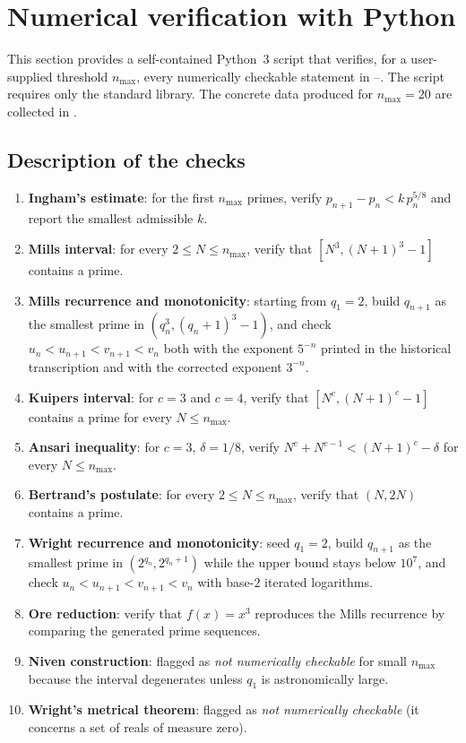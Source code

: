 \documentclass[11pt,reqno]{amsart}
\theoremstyle{redplain}
\numberwithin{equation}{section}
\begin{document}
\section{Numerical verification with Python}
\label{sec:python}

This section provides a self-contained Python~3 script that verifies, for
a user-supplied threshold $n_{\max}$, every numerically checkable
statement in --. The
script requires only the standard library. The concrete data produced for
$n_{\max}=20$ are collected in .

\subsection{Description of the checks}

\begin{enumerate}
\item \textbf{Ingham's estimate}: for the first $n_{\max}$ primes, verify
$p_{n+1}-p_n<k\,p_n^{5/8}$ and report the smallest admissible $k$.
\item \textbf{Mills interval}: for every $2\le N\le n_{\max}$, verify
      that $[N^3,(N+1)^3-1]$ contains a prime.
\item \textbf{Mills recurrence and monotonicity}: starting from $q_1=2$,
      build $q_{n+1}$ as the smallest prime in $(q_n^3,(q_n+1)^3-1)$, and
      check $u_n<u_{n+1}<v_{n+1}<v_n$ both with the exponent $5^{-n}$
      printed in the historical transcription and with the corrected
      exponent $3^{-n}$.
\item \textbf{Kuipers interval}: for $c=3$ and $c=4$, verify that
      $[N^c,(N+1)^c-1]$ contains a prime for every $N\le n_{\max}$.
\item \textbf{Ansari inequality}: for $c=3$, $\delta=1/8$, verify
      $N^c+N^{c-1}<(N+1)^c-\delta$ for every $N\le n_{\max}$.
\item \textbf{Bertrand's postulate}: for every $2\le N\le n_{\max}$,
      verify that $(N,2N)$ contains a prime.
\item \textbf{Wright recurrence and monotonicity}: seed $q_1=2$, build
      $q_{n+1}$ as the smallest prime in $(2^{q_n},2^{q_n+1})$ while the
      upper bound stays below $10^7$, and check
      $u_n<u_{n+1}<v_{n+1}<v_n$ with base-$2$ iterated logarithms.
\item \textbf{Ore reduction}: verify that $f(x)=x^3$ reproduces the Mills
      recurrence by comparing the generated prime sequences.
\item \textbf{Niven construction}: flagged as \emph{not numerically
      checkable} for small $n_{\max}$ because the interval degenerates
      unless $q_1$ is astronomically large.
\item \textbf{Wright's metrical theorem}: flagged as \emph{not
      numerically checkable} (it concerns a set of reals of measure zero).
\end{enumerate}
\end{document}
